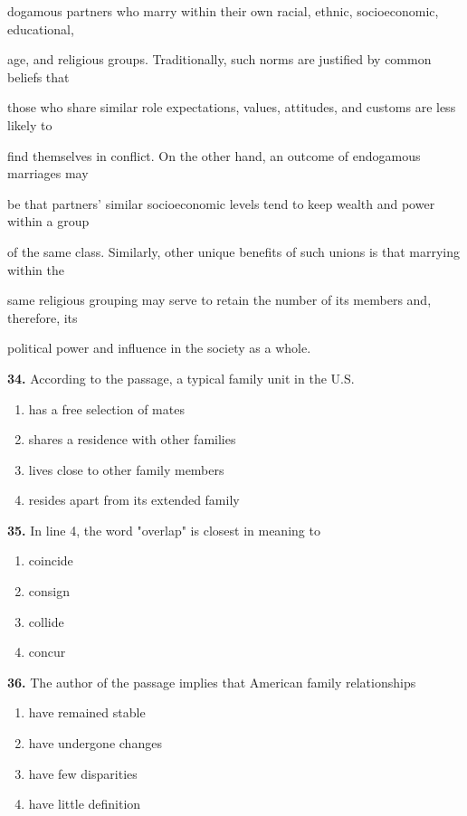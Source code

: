 \documentclass[12pt]{article}
\begin{document}
dogamous partners who marry within their own racial, ethnic, socioeconomic, educational,\par
age, and religious groups. Traditionally, such norms are justified by common beliefs that\par
those who share similar role expectations, values, attitudes, and customs are less likely to\par
find themselves in conflict. On the other hand, an outcome of endogamous marriages may\par
be that partners' similar socioeconomic levels tend to keep wealth and power within a group\par
of the same class. Similarly, other unique benefits of such unions is that marrying within the\par
same religious grouping may serve to retain the number of its members and, therefore, its\par
political power and influence in the society as a whole.\par
\endgroup
\medskip
\noindent\textbf{34.} According to the passage, a typical family unit in the U.S.
\begin{enumerate}[label=(\Alph*),leftmargin=*,itemsep=0.2em]
\item has a free selection of mates
\item shares a residence with other families
\item lives close to other family members
\item resides apart from its extended family
\end{enumerate}
\par
\vspace{0.25\baselineskip}
\noindent\textbf{35.} In line 4, the word "overlap" is closest in meaning to
\begin{enumerate}[label=(\Alph*),leftmargin=*,itemsep=0.2em]
\item coincide
\item consign
\item collide
\item concur
\end{enumerate}
\par
\vspace{0.25\baselineskip}
\noindent\textbf{36.} The author of the passage implies that American family relationships
\begin{enumerate}[label=(\Alph*),leftmargin=*,itemsep=0.2em]
\item have remained stable
\item have undergone changes
\item have few disparities
\item have little definition
\end{enumerate}
\end{document}
